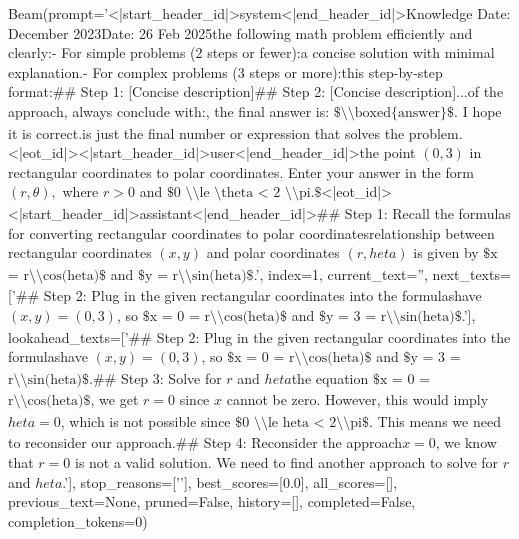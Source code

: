 Beam(prompt='<|start_header_id|>system<|end_header_id|>\n\nCutting Knowledge Date: December 2023\nToday Date: 26 Feb 2025\n\nSolve the following math problem efficiently and clearly:\n\n- For simple problems (2 steps or fewer):\nProvide a concise solution with minimal explanation.\n\n- For complex problems (3 steps or more):\nUse this step-by-step format:\n\n## Step 1: [Concise description]\n\n## Step 2: [Concise description]\n\n...\n\nRegardless of the approach, always conclude with:\n\nTherefore, the final answer is: $\\boxed{answer}$. I hope it is correct.\n\nWhere [answer] is just the final number or expression that solves the problem.<|eot_id|><|start_header_id|>user<|end_header_id|>\n\nConvert the point $(0,3)$ in rectangular coordinates to polar coordinates.  Enter your answer in the form $(r,\theta),$ where $r > 0$ and $0 \\le \theta < 2 \\pi.$<|eot_id|><|start_header_id|>assistant<|end_header_id|>\n\n## Step 1: Recall the formulas for converting rectangular coordinates to polar coordinates\nThe relationship between rectangular coordinates $(x,y)$ and polar coordinates $(r,heta)$ is given by $x = r\\cos(heta)$ and $y = r\\sin(heta)$.\n\n', index=1, current_text='', next_texts=['## Step 2: Plug in the given rectangular coordinates into the formulas\nWe have $(x,y) = (0,3)$, so $x = 0 = r\\cos(heta)$ and $y = 3 = r\\sin(heta)$.\n\n'], lookahead_texts=['## Step 2: Plug in the given rectangular coordinates into the formulas\nWe have $(x,y) = (0,3)$, so $x = 0 = r\\cos(heta)$ and $y = 3 = r\\sin(heta)$.\n\n## Step 3: Solve for $r$ and $heta$\nFrom the equation $x = 0 = r\\cos(heta)$, we get $r = 0$ since $x$ cannot be zero. However, this would imply $heta = 0$, which is not possible since $0 \\le heta < 2\\pi$. This means we need to reconsider our approach.\n\n## Step 4: Reconsider the approach\nSince $x = 0$, we know that $r = 0$ is not a valid solution. We need to find another approach to solve for $r$ and $heta$.\n\n'], stop_reasons=['\n\n'], best_scores=[0.0], all_scores=[], previous_text=None, pruned=False, history=[], completed=False, completion_tokens=0)


